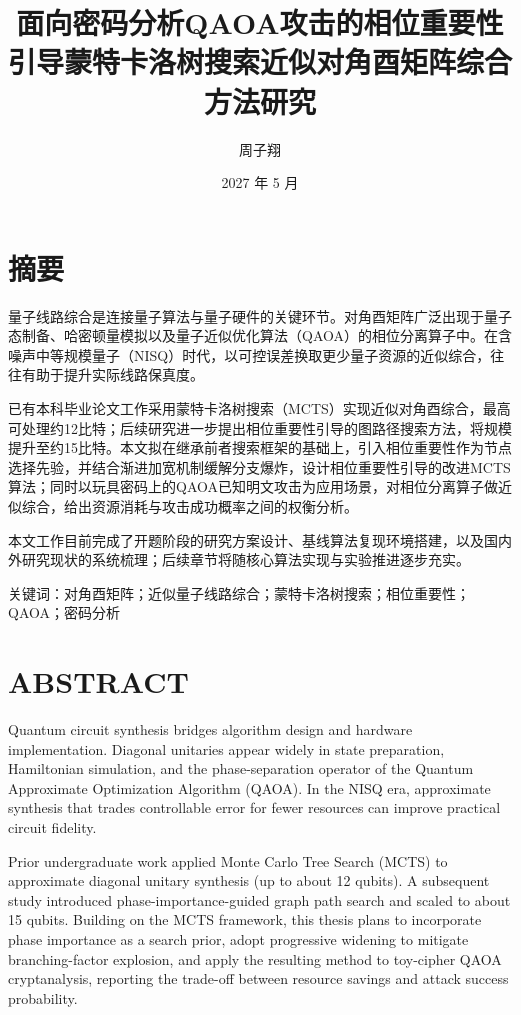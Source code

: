 \documentclass{HDU-Bachelor-Thesis}
\title{面向密码分析QAOA攻击的相位重要性引导蒙特卡洛树搜索近似对角酉矩阵综合方法研究}
\author{周子翔}%
\date{2027 年 5 月}
\begin{document}
\pagestyle{empty}

\maketitle

\clearpage
\pagestyle{HDU-bachelor-empty}

\section*{摘\hspace{2em}要}

量子线路综合是连接量子算法与量子硬件的关键环节。对角酉矩阵广泛出现于量子态制备、哈密顿量模拟以及量子近似优化算法（QAOA）的相位分离算子中。在含噪声中等规模量子（NISQ）时代，以可控误差换取更少量子资源的近似综合，往往有助于提升实际线路保真度。

已有本科毕业论文工作采用蒙特卡洛树搜索（MCTS）实现近似对角酉综合，最高可处理约12比特；后续研究进一步提出相位重要性引导的图路径搜索方法，将规模提升至约15比特。本文拟在继承前者搜索框架的基础上，引入相位重要性作为节点选择先验，并结合渐进加宽机制缓解分支爆炸，设计相位重要性引导的改进MCTS算法；同时以玩具密码上的QAOA已知明文攻击为应用场景，对相位分离算子做近似综合，给出资源消耗与攻击成功概率之间的权衡分析。

本文工作目前完成了开题阶段的研究方案设计、基线算法复现环境搭建，以及国内外研究现状的系统梳理；后续章节将随核心算法实现与实验推进逐步充实。

\vspace{\baselineskip}\noindent
\textsf{关键词：}对角酉矩阵；近似量子线路综合；蒙特卡洛树搜索；相位重要性；QAOA；密码分析

\clearpage
\section*{\textbf{ABSTRACT}}

Quantum circuit synthesis bridges algorithm design and hardware implementation. Diagonal unitaries appear widely in state preparation, Hamiltonian simulation, and the phase-separation operator of the Quantum Approximate Optimization Algorithm (QAOA). In the NISQ era, approximate synthesis that trades controllable error for fewer resources can improve practical circuit fidelity.

Prior undergraduate work applied Monte Carlo Tree Search (MCTS) to approximate diagonal unitary synthesis (up to about 12 qubits). A subsequent study introduced phase-importance-guided graph path search and scaled to about 15 qubits. Building on the MCTS framework, this thesis plans to incorporate phase importance as a search prior, adopt progressive widening to mitigate branching-factor explosion, and apply the resulting method to toy-cipher QAOA cryptanalysis, reporting the trade-off between resource savings and attack success probability.
\end{document}
